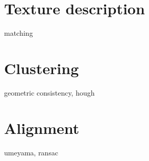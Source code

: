 
\section{Texture description} %
\label{sec:colour} %

matching \cite{ORB}


\section{Clustering}
\label{sec:clustering}

geometric consistency, hough


\section{Alignment}
\label{sec:alignment}

umeyama, ransac


